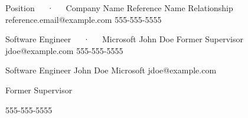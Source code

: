 \newpage{}

\begin{cventries}

   \cventry
   {Position~~~·~~~Company Name} %
   {Reference Name} %
   {Relationship} %
   {reference.email@example.com} %
   {555-555-5555} %

   \cventry
   {Software Engineer~~~·~~~Microsoft} %
   {John Doe} %
   {Former Supervisor} %
   {jdoe@example.com} %
   {555-555-5555} %

   \cventry
   {Software Engineer} %
   {John Doe} %
   {Microsoft} %
   {jdoe@example.com} %
   {
      \begin{cvitems} %
	 \item{Former Supervisor} %
	 \item{555-555-5555} %
      \end{cvitems}
   }

\end{cventries}
